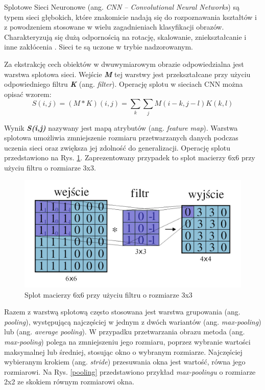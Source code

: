 Splotowe Sieci Neuronowe (ang. \emph{CNN -- Convolutional Neural Networks}) są typem sieci głębokich, które znakomicie nadają się do rozpoznawania kształtów i z powodzeniem stosowane w wielu zagadnieniach klasyfikacji obrazów. Charakteryzują się dużą odpornością na rotację, skalowanie, zniekształcanie i inne zakłócenia \cite{haykin2009neural}. Sieci te są uczone w trybie nadzorowanym. 

Za ekstrakcję cech obiektów w dwuwymiarowym obrazie odpowiedzialna jest warstwa splotowa sieci. Wejście \textbf{\emph{M}} tej warstwy jest przekształcane przy użyciu odpowiedniego filtru \textbf{\emph{K}} (ang. \emph{filter}). Operację splotu w sieciach CNN można opisać wzorem:
$$
S(i,j) = (M*K)(i,j) =\sum_{k}{\sum_{j}{M(i - k, j - l)K(k, l)}}
$$

Wynik \textbf{\emph{S(i,j)}} nazywany jest mapą atrybutów (ang. \emph{feature map}). Warstwa splotowa umożliwia zmniejszenie rozmiaru przetwarzanych danych podczas uczenia sieci oraz zwiększa jej zdolność do generalizacji. Operację splotu przedstawiono na Rys. \ref{conv}. Zaprezentowany przypadek to splot macierzy 6x6 przy użyciu filtru o rozmiarze 3x3. 


\begin{figure}[!h]
  \centering
  \includegraphics[width=\textwidth]{img/conv.jpg}
  \caption{Splot macierzy 6x6 przy użyciu filtru o rozmiarze 3x3}
  \label{conv}
\end{figure}



Razem z warstwą splotową często stosowana jest warstwa grupowania (ang. \emph{pooling}), występującą najczęściej w jednym z dwóch wariantów (ang. \emph{max-pooling}) lub (ang. \emph{average pooling}). W przypadku przetwarzania obrazu metoda (ang. \emph{max-pooling}) polega na zmniejszeniu jego rozmiaru, poprzez wybranie wartości maksymalnej lub średniej, stosując okno o wybranym rozmiarze. Najczęściej wybieranym krokiem (ang. \emph{stride}) przesuwania okna jest wartość, równa jego rozmiarowi. Na Rys. \ref{pooling} przedstawiono przykład \emph{max-poolingu} o rozmiarze 2x2 ze skokiem równym rozmiarowi okna.

